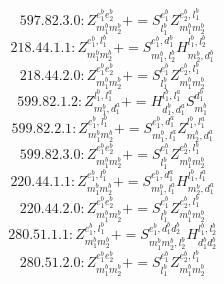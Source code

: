 \documentclass[letterpaper,10pt,fleqn,leqno,onecolumn]{article}
\begin{document}
\begin{equation} \;\;\;\;\;\;  597.82.3.0: Z^{e_{1}^{b}e_{2}^{b}}_{m_{1}^{b}m_{2}^{b}}+=S^{e_{1}^{b}}_{l_{1}^{b}}Z^{e_{2}^{b},l_{1}^{b}}_{m_{1}^{b}m_{2}^{b}} \end{equation}
\begin{equation} \;\;\;\;\;\;  218.44.1.1: Z^{e_{1}^{b},l_{1}^{b}}_{m_{1}^{b}m_{2}^{b}}+=S^{e_{1}^{b},d_{1}^{b}}_{m_{1}^{b},l_{2}^{b}}H^{l_{1}^{b},l_{2}^{b}}_{m_{2}^{b},d_{1}^{b}} \end{equation}
\begin{equation} \;\;\;\;\;\;  218.44.2.0: Z^{e_{1}^{b}e_{2}^{b}}_{m_{1}^{b}m_{2}^{b}}+=S^{e_{1}^{b}}_{l_{1}^{b}}Z^{e_{2}^{b},l_{1}^{b}}_{m_{1}^{b}m_{2}^{b}} \end{equation}
\begin{equation} \;\;\;\;\;\;  599.82.1.2: Z^{l_{1}^{b},l_{1}^{a}}_{m_{1}^{b},d_{1}^{a}}+=H^{l_{1}^{b},l_{1}^{a}}_{d_{1}^{b},d_{1}^{a}}S^{d_{1}^{b}}_{m_{1}^{b}} \end{equation}
\begin{equation} \;\;\;\;\;\;  599.82.2.1: Z^{e_{1}^{b},l_{1}^{b}}_{m_{1}^{b}m_{2}^{b}}+=S^{e_{1}^{b},d_{1}^{a}}_{m_{1}^{b},l_{1}^{a}}Z^{l_{1}^{b},l_{1}^{a}}_{m_{2}^{b},d_{1}^{a}} \end{equation}
\begin{equation} \;\;\;\;\;\;  599.82.3.0: Z^{e_{1}^{b}e_{2}^{b}}_{m_{1}^{b}m_{2}^{b}}+=S^{e_{1}^{b}}_{l_{1}^{b}}Z^{e_{2}^{b},l_{1}^{b}}_{m_{1}^{b}m_{2}^{b}} \end{equation}
\begin{equation} \;\;\;\;\;\;  220.44.1.1: Z^{e_{1}^{b},l_{1}^{b}}_{m_{1}^{b}m_{2}^{b}}+=S^{e_{1}^{b},d_{1}^{a}}_{m_{1}^{b},l_{1}^{a}}H^{l_{1}^{b},l_{1}^{a}}_{m_{2}^{b},d_{1}^{a}} \end{equation}
\begin{equation} \;\;\;\;\;\;  220.44.2.0: Z^{e_{1}^{b}e_{2}^{b}}_{m_{1}^{b}m_{2}^{b}}+=S^{e_{1}^{b}}_{l_{1}^{b}}Z^{e_{2}^{b},l_{1}^{b}}_{m_{1}^{b}m_{2}^{b}} \end{equation}
\begin{equation} \;\;\;\;\;\;  280.51.1.1: Z^{e_{1}^{b},l_{1}^{b}}_{m_{1}^{b}m_{2}^{b}}+=S^{e_{1}^{b},d_{1}^{b}d_{2}^{b}}_{m_{1}^{b}m_{2}^{b},l_{2}^{b}}H^{l_{1}^{b},l_{2}^{b}}_{d_{1}^{b}d_{2}^{b}} \end{equation}
\begin{equation} \;\;\;\;\;\;  280.51.2.0: Z^{e_{1}^{b}e_{2}^{b}}_{m_{1}^{b}m_{2}^{b}}+=S^{e_{1}^{b}}_{l_{1}^{b}}Z^{e_{2}^{b},l_{1}^{b}}_{m_{1}^{b}m_{2}^{b}} \end{equation}
\end{document}
